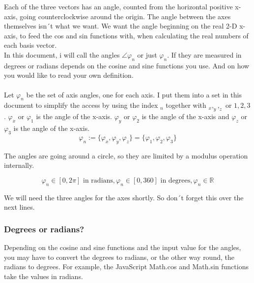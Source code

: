 \documentclass[a4paper]{article}
\begin{document}
Each of the three vectors has an angle, counted from the horizontal positive x-axis, going counterclockwise around the origin. The
angle between the axes themselves isn´t what we want. We want the angle beginning on the real 2-D x-axis, to feed the cos and sin functions with, when calculating the real numbers of each basis vector.\\

In this document, i will call the angles $\angle \varphi_{n}$ or just $\varphi_{n}$. If they are measured in degrees or radians depends on the cosine and sine functions you use. And on how you would like to read your own definition.\\

\\


Let $\varphi_{n}$ be the set of axis angles, one for each axis. I put them into a set in this document to simplify the access by
using the index $_{n}$ together with $_x, _y, _z$ or $1,2,3$. $\varphi_x$ or $\varphi_1$ is the angle of the x-axis. $\varphi_y$ or $\varphi_2$ is the angle of the x-axis and $\varphi_z$ or $\varphi_3$ is the angle of the x-axis. \\

\begin{displaymath}
\varphi_{n} := \{\varphi_x, \varphi_y, \varphi_z\} = \{ \varphi_1, \varphi_2, \varphi_3 \}
\end{displaymath}

The angles are going around a circle, so they are limited by a modulus operation internally.

\begin{displaymath}
 \varphi_n \in [0,2\pi] \mbox{ in radians}, \varphi_n \in [0,360] \mbox{ in degrees}, \varphi_n \in \mathbb{R}
\end{displaymath}

We will need the three angles for the axes shortly. So don´t forget this over the next lines.\\

\subsubsection{Degrees or radians?}

Depending on the cosine and sine functions and the input value for the angles, you may have to convert the degrees to radians, or
the other way round, the radians to degrees. For example, the JavaScript Math.cos and Math.sin functions take the values in radians.\\
\end{document}

